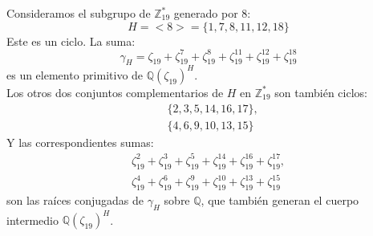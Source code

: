 \begin{example}
    Consideramos el subgrupo de $\mathbb{Z}^*_{19}$ generado por 8:
    $$H = < 8 > = \{ 1, 7, 8, 11, 12, 18 \}$$
    Este es un ciclo. La suma:
    $$\gamma_H = \zeta_{19} + \zeta^7_{19} + \zeta^8_{19} + \zeta^{11}_{19} + \zeta^{12}_{19} + \zeta^{18}_{19}$$
    es un elemento primitivo de $\mathbb{Q}(\zeta_{19})^H$.\\
    Los otros dos conjuntos complementarios de $H$ en $\mathbb{Z}^*_{19}$ son también ciclos:
    \begin{align*}
         & \{ 2, 3, 5, 14, 16, 17 \}, \\
         & \{ 4, 6, 9, 10, 13, 15 \}
    \end{align*}
    Y las correspondientes sumas:
    \begin{align*}
        \zeta^2_{19} + \zeta^3_{19} + \zeta^5_{19} + \zeta^{14}_{19} + \zeta^{16}_{19} + \zeta^{17}_{19}, \\
        \zeta^4_{19} + \zeta^6_{19} + \zeta^9_{19} + \zeta^{10}_{19} + \zeta^{13}_{19} + \zeta^{15}_{19}
    \end{align*}
    son las raíces conjugadas de $\gamma_H$ sobre $\mathbb{Q}$, que también generan el cuerpo intermedio $\mathbb{Q}(\zeta_{19})^H$.
\end{example}